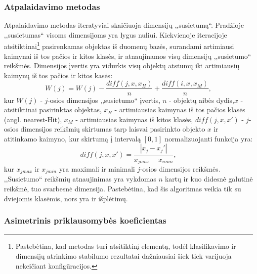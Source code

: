 \subsubsection{Atpalaidavimo metodas}

Atpalaidavimo metodas iteratyviai skaičiuoja dimensijų ,,susietumą``. Pradžioje
,,susietumas`` visoms dimensijoms yra lygus nuliui. Kiekvienoje
iteracijoje atsitiktinai\footnote{Pastebėtina, kad metodas 
turi atsitiktinį elementą, todėl klasifikavimo ir  dimensijų atrinkimo stabilumo
rezultatai dažniausiai šiek tiek varijuoja nekeičiant konfigūracijos.} 
pasirenkamas objektas iš duomenų bazės, surandami
artimiausi kaimynai iš tos pačios ir kitos klasės, ir atnaujinamos visų 
dimensijų ,,susietumo`` reikšmės. Dimensijos įvertis yra vidurkis visų objektų
atstumų iki artimiausių kaimynų iš tos pačios ir kitos kasės:
\begin{equation}
 W(j)=W(j) - \frac{diff(j, x, x_H)}{n} + \frac{diff(i, x, x_M)}{n},
\end{equation}
kur $W(j)$ - $j$-osios dimensijos ,,susietumo`` įvertis, $n$ - objektų aibės 
dydis,$x$ - atsitiktinai pasirinktas objektas, $x_H$ - artimiausias
kaimynas iš tos pačios klasės (angl. nearest-Hit), $x_M$ - artimiausias kaimynas
iš kitos klasės, $diff(j, x, x')$ - $j$-osios dimensijos reikšmių skirtumas
tarp laisvai pasirinkto objekto $x$ ir atitinkamo kaimyno, kur skirtumą į
intervalą $[0, 1]$ normalizuojanti funkcija yra:
\begin{equation}
 diff(j, x, x')=\frac{|x_j- x_j'|}{x_{j max} - x_{i min}},
\end{equation}
kur $x_{j max}$ ir $x_{j min}$ yra maximali ir minimali $j$-osios dimensijos
reikšmės. ,,Susietumo`` reikšmių atnaujinimas yra vykdomas $n$ kartų ir kuo
didesnė galutinė reikšmė, tuo svarbesnė dimensija. Pastebėtina, kad šis algoritmas
veikia tik su dviejomis klasėmis, nors yra ir išplėtimų.

\subsubsection{Asimetrinis priklausomybės koeficientas}

